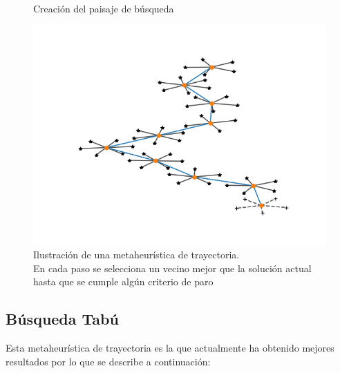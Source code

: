 \begin{figure}[H]
\caption{Creación del paisaje de búsqueda}
\end{figure}

\begin{figure}[H]
\centering
\includegraphics[scale=.5]{Imagenes/mettray.png}
\caption{Ilustración de una metaheurística de trayectoria.\\ En cada paso se selecciona un vecino mejor que la solución actual hasta que se cumple algún criterio de paro }
\end{figure}
\subsection{Búsqueda Tabú}
Esta metaheurística de trayectoria es la que actualmente ha obtenido mejores resultados por lo que se describe a continuación:
